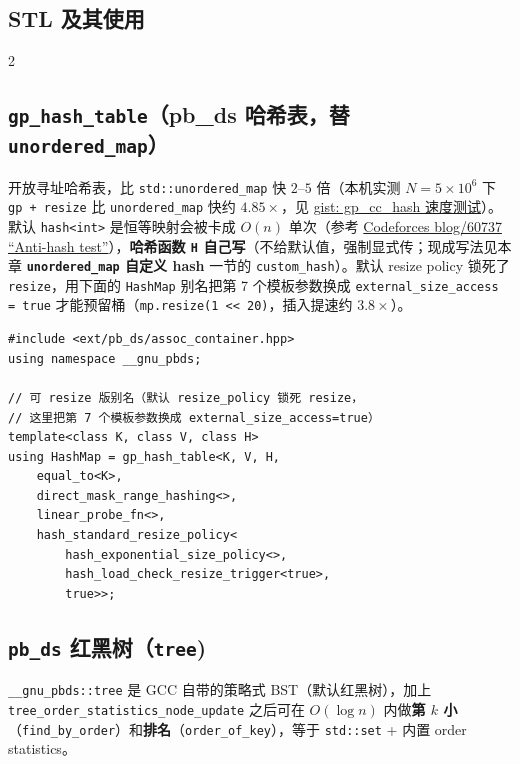 	\begin{center}
		\section{STL 及其使用}
	\end{center}

	\begin{multicols*}{2}

		\subsection[\tochl{\texttt{gp\_hash\_table}（pb\_ds 哈希表，替 \texttt{unordered\_map}）}]{\texttt{gp\_hash\_table}（pb\_ds 哈希表，替 \texttt{unordered\_map}）}

		开放寻址哈希表，比 \verb|std::unordered_map| 快 $2$--$5$ 倍（本机实测 $N = 5 \times 10^6$ 下 \verb|gp + resize| 比 \verb|unordered_map| 快约 $4.85\times$，见 \href{https://gist.github.com/znzryb/b620166d705579fcecb02649ed5da03d}{gist: gp\_cc\_hash 速度测试}）。默认 \verb|hash<int>| 是恒等映射会被卡成 $O(n)$ 单次（参考 \href{https://codeforces.com/blog/entry/60737}{Codeforces blog/60737 \enquote{Anti-hash test}}），\textbf{哈希函数 \texttt{H} 自己写}（不给默认值，强制显式传；现成写法见本章 \textbf{\texttt{unordered\_map} 自定义 hash} 一节的 \texttt{custom\_hash}）。默认 resize policy 锁死了 \verb|resize|，用下面的 \verb|HashMap| 别名把第 7 个模板参数换成 \verb|external_size_access = true| 才能预留桶（\verb|mp.resize(1 << 20)|，插入提速约 $3.8\times$）。

		\begin{verbatim}
#include <ext/pb_ds/assoc_container.hpp>
using namespace __gnu_pbds;

// 可 resize 版别名（默认 resize_policy 锁死 resize，
// 这里把第 7 个模板参数换成 external_size_access=true）
template<class K, class V, class H>
using HashMap = gp_hash_table<K, V, H,
    equal_to<K>,
    direct_mask_range_hashing<>,
    linear_probe_fn<>,
    hash_standard_resize_policy<
        hash_exponential_size_policy<>,
        hash_load_check_resize_trigger<true>,
        true>>;
		\end{verbatim}

		\subsection[\tochl{\texttt{pb\_ds} 红黑树（\texttt{tree})}]{\texttt{pb\_ds} 红黑树（\texttt{tree})}

		\verb|__gnu_pbds::tree| 是 GCC 自带的策略式 BST（默认红黑树），加上 \verb|tree_order_statistics_node_update| 之后可在 $O(\log n)$ 内做\textbf{第 $k$ 小}（\verb|find_by_order|）和\textbf{排名}（\verb|order_of_key|），等于 \verb|std::set| + 内置 order statistics。


\end{multicols*}
